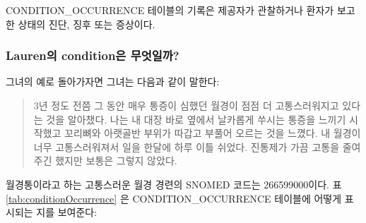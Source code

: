\documentclass[11pt]{book}
\theoremstyle{definition}
\theoremstyle{definition}
\theoremstyle{definition}
\theoremstyle{remark}
\begin{document}
CONDITION\_OCCURRENCE 테이블의 기록은 제공자가 관찰하거나 환자가 보고한
상태의 진단, 징후 또는 증상이다.

\subsubsection*{Lauren의 condition은 무엇일까?}\label{lauren-condition-}

그녀의 예로 돌아가자면 그녀는 다음과 같이 말한다:

\begin{quote}
3년 정도 전쯤 그 동안 매우 통증이 심했던 월경이 점점 더 고통스러워지고
있다는 것을 알아챘다. 나는 내 대장 바로 옆에서 날카롭게 쑤시는 통증을
느끼기 시작했고 꼬리뼈와 아랫골반 부위가 따갑고 부풀어 오르는 것을
느꼈다. 내 월경이 너무 고통스러워져서 일을 한달에 하루 이틀 쉬었다.
진통제가 가끔 고통을 줄여 주긴 했지만 보통은 그렇지 않았다.
\end{quote}

월경통이라고 하는 고통스러운 월경 경련의 SNOMED 코드는 266599000이다. 표
\ref{tab:conditionOccurrence} 은 CONDITION\_OCCURRENCE 테이블에 어떻게
표시되는 지를 보여준다:
\end{document}
